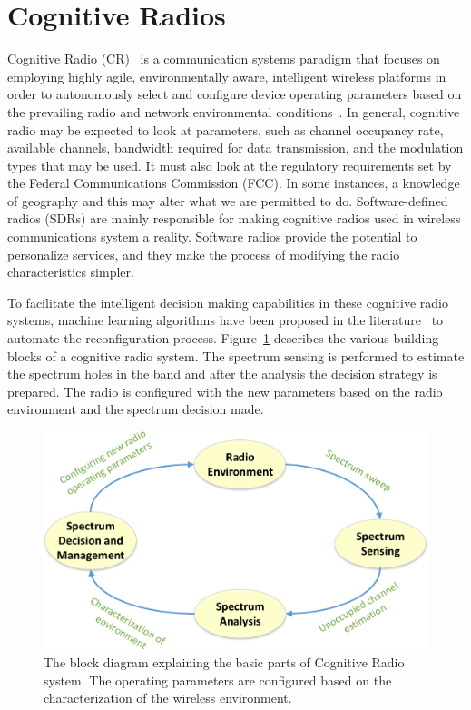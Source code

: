 \section{Cognitive Radios}
Cognitive Radio (CR)~\cite{cogjm} is a communication systems paradigm that focuses on employing highly agile, environmentally aware, intelligent wireless platforms in
order to autonomously select and configure device operating parameters based on the prevailing radio and network environmental conditions~\cite{bookhtn1}. In general, cognitive radio may be expected to look at parameters, such as channel occupancy rate, available channels, bandwidth required for data transmission, and the modulation types that may be used. It must also look at the regulatory requirements set by the Federal Communications Commission (FCC). In some instances, a knowledge of geography and this may alter what we are permitted to do. Software-defined radios (SDRs) are mainly responsible for making cognitive radios used in wireless communications system a reality. Software radios provide the potential to personalize services, and they make the process of modifying the radio characteristics simpler. 

To facilitate the intelligent decision making capabilities in these cognitive radio systems, machine learning algorithms have been proposed in the literature~\cite{barker2008mission,haykin2005cognitive,newman2007cognitive,newman2008population} to automate the reconfiguration process. Figure~\ref{cograd} describes the various building blocks of a cognitive radio system. The spectrum sensing is performed to estimate the spectrum holes in the band and after the analysis the decision strategy is prepared. The radio is configured with the new parameters based on the radio environment and the spectrum decision made.  

\begin{figure}[ht!]
	\centering
	\includegraphics[width=\textwidth,keepaspectratio]{images/Gill/figs/cognitive_radio.eps}
    \caption{The block diagram explaining the basic parts of Cognitive Radio system. The operating parameters are configured based on the characterization of the wireless environment.} 
\label{cograd}      
\end{figure}

